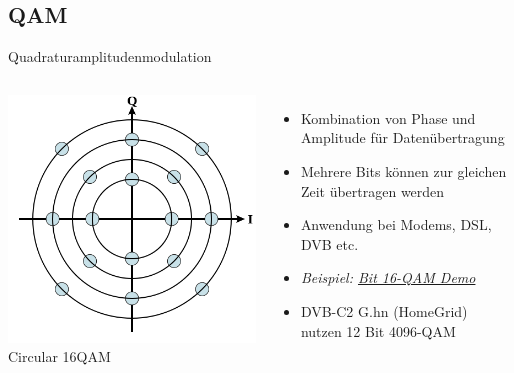 \subsection{QAM}
\begin{frame}{Quadraturamplitudenmodulation}
  \begin{columns}
    \includegraphics[width=\textwidth,height=.8\textheight,keepaspectratio]{a15/Circular_16QAM.png}\\
    {\tiny Circular 16QAM}
    \begin{itemize}
      \item Kombination von Phase und Amplitude für Datenübertragung
      \item Mehrere Bits können zur gleichen Zeit übertragen werden
      \item Anwendung bei Modems, DSL, DVB etc.
      \item \emph{Beispiel: \href{https://upload.wikimedia.org/wikipedia/commons/9/90/QAM16_Demonstration.gif}{ Bit 16-QAM Demo}}
      \item DVB-C2 G.hn (HomeGrid) nutzen 12 Bit 4096-QAM
    \end{itemize}
  \end{columns}
\end{frame}


